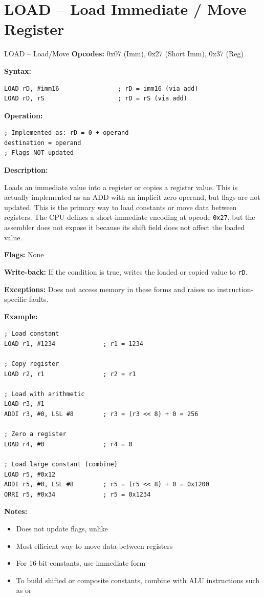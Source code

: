 \section{LOAD -- Load Immediate / Move Register}

\begin{instructionbox}{LOAD -- Load/Move}
	\textbf{Opcodes:} 0x07 (Imm), 0x27 (Short Imm), 0x37 (Reg)

	\textbf{Syntax:}
	\begin{lstlisting}
LOAD rD, #imm16                ; rD = imm16 (via add)
LOAD rD, rS                    ; rD = rS (via add)
\end{lstlisting}

	\textbf{Operation:}
	\begin{verbatim}
; Implemented as: rD = 0 + operand
destination = operand
; Flags NOT updated
\end{verbatim}

	\textbf{Description:}

	Loads an immediate value into a register or copies a register value. This is actually implemented as an ADD with an
	implicit zero operand, but flags are not updated. This is the primary way to load constants or move data between
	registers. The CPU defines a short-immediate  encoding at opcode \texttt{0x27}, but the assembler does
	not expose it because its shift field does not affect the loaded value.

	\textbf{Flags:} None

	\textbf{Write-back:} If the condition is true, writes the loaded or copied value to \texttt{rD}.

	\textbf{Exceptions:} Does not access memory in these forms and raises no instruction-specific faults.

	\textbf{Example:}
	\begin{lstlisting}
; Load constant
LOAD r1, #1234             ; r1 = 1234

; Copy register
LOAD r2, r1                ; r2 = r1

; Load with arithmetic
LOAD r3, #1
ADDI r3, #0, LSL #8        ; r3 = (r3 << 8) + 0 = 256

; Zero a register
LOAD r4, #0                ; r4 = 0

; Load large constant (combine)
LOAD r5, #0x12
ADDI r5, #0, LSL #8        ; r5 = (r5 << 8) + 0 = 0x1200
ORRI r5, #0x34             ; r5 = 0x1234
\end{lstlisting}

	\textbf{Notes:}
	\begin{itemize}
		\item Does not update flags, unlike 
		\item Most efficient way to move data between registers
		\item For 16-bit constants, use immediate form
		\item To build shifted or composite constants, combine  with ALU instructions such as  or 
	\end{itemize}
\end{instructionbox}

